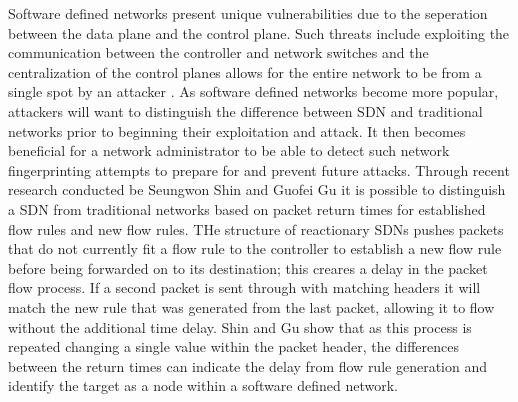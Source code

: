 \documentclass[twocolumn]{article}
\begin{document}
	Software defined networks present unique vulnerabilities due to the seperation between the data plane and the control plane. Such threats include exploiting the communication between the controller and network switches and the centralization of the control planes allows for the entire network to be from a single spot by an attacker \cite{kreutz}. As software defined networks become more popular, attackers will want to distinguish the difference between SDN and traditional networks prior to beginning their exploitation and attack. It then becomes beneficial for a network administrator to be able to detect such network fingerprinting attempts to prepare for and prevent future attacks. Through recent research conducted be Seungwon Shin and Guofei Gu \cite{Gu13} it is possible to distinguish a SDN from traditional networks based on packet return times for established flow rules and new flow rules. THe structure of reactionary SDNs pushes packets that do not currently fit a flow rule to the controller to establish a new flow rule before being forwarded on to its destination; this creares a delay in the packet flow process. If a second packet is sent through with matching headers it will match the new rule that was generated from the last packet, allowing it to flow without the additional time delay. Shin and Gu show that as this process is repeated changing a single value within the packet header, the differences between the return times can indicate the delay from flow rule generation and identify the target as a node within a software defined network.
\end{document}
